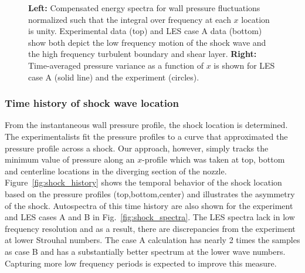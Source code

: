 \documentclass[]{aiaa-tc}%
\begin{document}
\begin{figure}[!h]
	\caption{ {\bf Left:} Compensated energy spectra for wall pressure fluctuations normalized such that the integral over frequency at each $x$ location is unity.  Experimental data (top) and LES case A data (bottom) show both depict the low frequency motion of the shock wave and the high frequency turbulent boundary and shear layer. {\bf Right:} Time-averaged pressure variance as a function of $x$ is shown for LES case A (solid line) and the experiment (circles).
	}
\end{figure}



\subsubsection{Time history of shock wave location }

From the instantaneous wall pressure profile, the shock location is determined.  The experimentalists fit the pressure profiles to a curve that approximated the pressure profile across a shock.  Our approach, however, simply tracks the minimum value of pressure along an $x$-profile which was taken at top, bottom and centerline locations in the diverging section of the nozzle.  Figure~\ref{fig:shock_history} shows the temporal behavior of the shock location based on the pressure profiles (top,bottom,center) and illustrates the asymmetry of the shock.  Autospectra of this time history are also shown for the experiment and LES cases A and B in Fig.~\ref{fig:shock_spectra}.  The LES spectra lack in low frequency resolution and as a result, there are discrepancies from the experiment at lower Strouhal numbers.  The case A calculation has nearly 2 times the samples as case B and has a substantially better spectrum at the lower wave numbers.  Capturing more low frequency periods is expected to improve this measure.  
\end{document}
